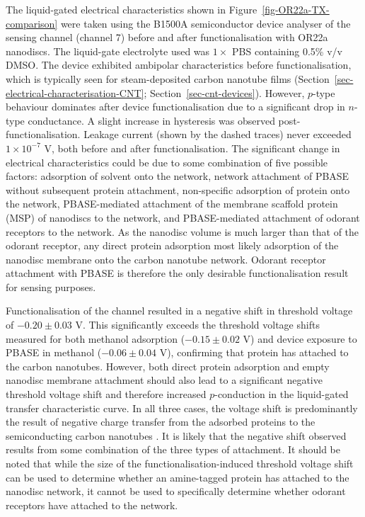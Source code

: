 \documentclass[
  a4paper,
]{scrbook}
\begin{document}
The liquid-gated electrical characteristics shown in
Figure~\ref{fig-OR22a-TX-comparison} were taken using the B1500A
semiconductor device analyser of the sensing channel (channel 7) before
and after functionalisation with OR22a nanodiscs. The liquid-gate
electrolyte used was \(1 \times\) PBS containing 0.5\% v/v DMSO. The
device exhibited ambipolar characteristics before functionalisation,
which is typically seen for steam-deposited carbon nanotube films
(Section~\ref{sec-electrical-characterisation-CNT};
Section~\ref{sec-cnt-devices}). However, \(p\)-type behaviour dominates
after device functionalisation due to a significant drop in \(n\)-type
conductance. A slight increase in hysteresis was observed
post-functionalisation. Leakage current (shown by the dashed traces)
never exceeded \(1 \times 10^{-7}\) V, both before and after
functionalisation. The significant change in electrical characteristics
could be due to some combination of five possible factors: adsorption of
solvent onto the network, network attachment of PBASE without subsequent
protein attachment, non-specific adsorption of protein onto the network,
PBASE-mediated attachment of the membrane scaffold protein (MSP) of
nanodiscs to the network, and PBASE-mediated attachment of odorant
receptors to the network. As the nanodisc volume is much larger than
that of the odorant receptor, any direct protein adsorption most likely
adsorption of the nanodisc membrane onto the carbon nanotube network.
Odorant receptor attachment with PBASE is therefore the only desirable
functionalisation result for sensing purposes.

Functionalisation of the channel resulted in a negative shift in
threshold voltage of \(-0.20 \pm 0.03\) V. This significantly exceeds
the threshold voltage shifts measured for both methanol adsorption
(\(-0.15 \pm 0.02\) V) and device exposure to PBASE in methanol
(\(-0.06 \pm 0.04\) V), confirming that protein has attached to the
carbon nanotubes. However, both direct protein adsorption
\autocite{Bradley2004,Heller2008,Kauffman2008} and empty nanodisc
membrane attachment \autocite{Murugathas2019a} should also lead to a
significant negative threshold voltage shift and therefore increased
\(p\)-conduction in the liquid-gated transfer characteristic curve. In
all three cases, the voltage shift is predominantly the result of
negative charge transfer from the adsorbed proteins to the
semiconducting carbon nanotubes
\autocite{Bradley2004,Heller2008,Murugathas2019a}. It is likely that the
negative shift observed results from some combination of the three types
of attachment. It should be noted that while the size of the
functionalisation-induced threshold voltage shift can be used to
determine whether an amine-tagged protein has attached to the nanodisc
network, it cannot be used to specifically determine whether odorant
receptors have attached to the network.
\end{document}
